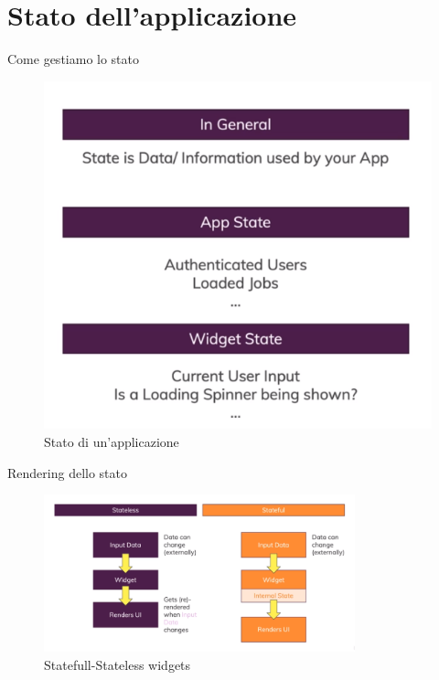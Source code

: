 \documentclass{../libs/presentation_format}
\begin{document}
\section{Stato dell'applicazione}
\begin{frame}{Come gestiamo lo stato}
	\begin{figure}[htpb]
		\centering
		\includegraphics[scale=0.3]{../libs/understanding-state.png}
		\caption{Stato di un'applicazione}
		\label{fig: Stato di un'applicazione}
	\end{figure}
\end{frame}


\begin{frame}{Rendering dello stato}
	\begin{figure}[htpb]
		\centering
		\includegraphics[width=9cm]{../libs/stateless-statefull.png}
		\caption{Statefull-Stateless widgets}
		\label{fig: Statefull-Stateless widgets}
	\end{figure}
\end{frame}
\end{document}
